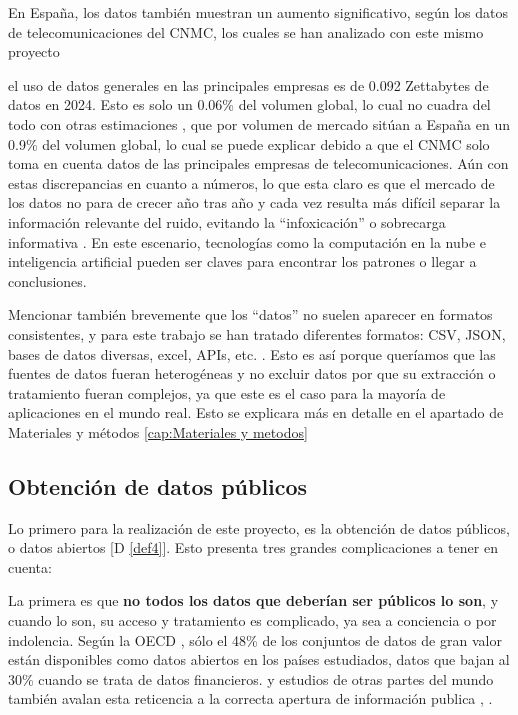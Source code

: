 En España, los datos también muestran un aumento significativo, según los datos de telecomunicaciones del CNMC, los cuales se han analizado con este mismo proyecto \citep{DatosGeneralesCNMC} 

el uso de datos generales en las principales empresas es de 0.092 Zettabytes de datos en 2024.
Esto es solo un 0.06\% del volumen global, lo cual no cuadra del todo con otras estimaciones \citep{DatosMercadosEspanna}, que por volumen de mercado sitúan a España en un 0.9\% del volumen global, lo cual se puede explicar debido a que el CNMC solo toma en cuenta datos de las principales empresas de telecomunicaciones. 
Aún con estas discrepancias en cuanto a números, lo que esta claro es que el mercado de los datos no para de crecer año tras año y cada vez resulta más difícil separar la información relevante del ruido, evitando la ``infoxicación'' o sobrecarga informativa \citep{Infoxicacion}. En este escenario, tecnologías como la computación en la nube e inteligencia artificial pueden ser claves para encontrar los patrones o llegar a conclusiones.

Mencionar también brevemente que los ``datos'' no suelen aparecer en formatos consistentes, y para este trabajo se han tratado diferentes formatos: CSV, JSON, bases de datos diversas, excel, APIs, etc. \citep{khan2019fileFormats}. Esto es así porque queríamos que las fuentes de datos fueran heterogéneas y no excluir datos por que su extracción o tratamiento fueran complejos, ya que este es el caso para la mayoría de aplicaciones en el mundo real. Esto se explicara más en detalle en el apartado de Materiales y métodos \ref{cap:Materiales y metodos} %

\subsection{Obtención de datos públicos}
	
	Lo primero para la realización de este proyecto, es la obtención de datos públicos, o datos abiertos [D \ref{def4}]. Esto presenta tres grandes complicaciones a tener en cuenta:
	
	La primera es que \textbf{no todos los datos que deberían ser públicos lo son}, y cuando lo son, su acceso y tratamiento es complicado, ya sea a conciencia o por indolencia. Según la OECD \citep{OECD2023openData}, sólo el 48\% de los conjuntos de datos de gran valor están disponibles como datos abiertos en los países estudiados, datos que bajan al 30\% cuando se trata de datos financieros. y estudios de otras partes del mundo también avalan esta reticencia a la correcta apertura de información publica \citep{TransparenciaEcuador}, \citep{TransparenciaMexico}.
	
